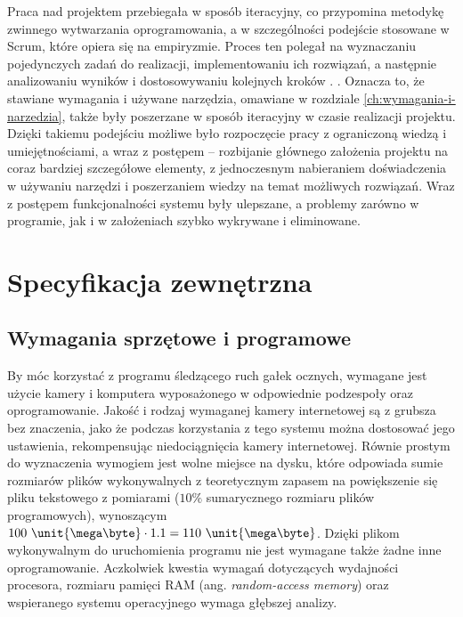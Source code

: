 \documentclass[a4paper,twoside,12pt]{book}
\newcommand{\obcy}[1]{\emph{#1}}
\newcommand{\english}[1]{{\selectlanguage{british}\obcy{#1}}}
\begin{document}
Praca nad projektem przebiegała w sposób iteracyjny, co przypomina metodykę zwinnego wytwarzania oprogramowania, a w szczególności podejście stosowane w Scrum, które opiera się na empiryzmie. Proces ten polegał na wyznaczaniu pojedynczych zadań do realizacji, implementowaniu ich rozwiązań, a następnie analizowaniu wyników i dostosowywaniu kolejnych kroków \cite{bib:Scrum-guide}. . Oznacza to, że stawiane wymagania i używane narzędzia, omawiane w rozdziale \ref{ch:wymagania-i-narzedzia}, także były poszerzane w sposób iteracyjny w czasie realizacji projektu. Dzięki takiemu podejściu możliwe było rozpoczęcie pracy z ograniczoną wiedzą i umiejętnościami, a wraz z postępem -- rozbijanie głównego założenia projektu na coraz bardziej szczegółowe elementy, z jednoczesnym nabieraniem doświadczenia w używaniu narzędzi i poszerzaniem wiedzy na temat możliwych rozwiązań. Wraz z postępem funkcjonalności systemu były ulepszane, a problemy zarówno w programie, jak i w założeniach szybko wykrywane i eliminowane.




%
%
%
\chapter{Specyfikacja zewnętrzna}
\label{ch:Specyfikacja-zewnetrzna}

\section{Wymagania sprzętowe i programowe}


By móc korzystać z programu śledzącego ruch gałek ocznych, wymagane jest użycie kamery i komputera wyposażonego w odpowiednie podzespoły oraz oprogramowanie. Jakość i rodzaj wymaganej kamery internetowej są z grubsza bez znaczenia, jako że podczas korzystania z tego systemu można dostosować jego ustawienia, rekompensując niedociągnięcia kamery internetowej. Równie prostym do wyznaczenia wymogiem jest wolne miejsce na dysku, które odpowiada sumie rozmiarów plików wykonywalnych z teoretycznym zapasem na powiększenie się pliku tekstowego z pomiarami ($10\%$ sumarycznego rozmiaru plików programowych), wynoszącym $100 \ \unit{\mega\byte} \cdot 1.1 = 110 \ \unit{\mega\byte}$. Dzięki plikom wykonywalnym do uruchomienia programu nie jest wymagane także żadne inne oprogramowanie. Aczkolwiek kwestia wymagań dotyczących wydajności procesora, rozmiaru pamięci RAM (ang. \english{random-access memory}) oraz wspieranego systemu operacyjnego wymaga głębszej analizy.
\end{document}
